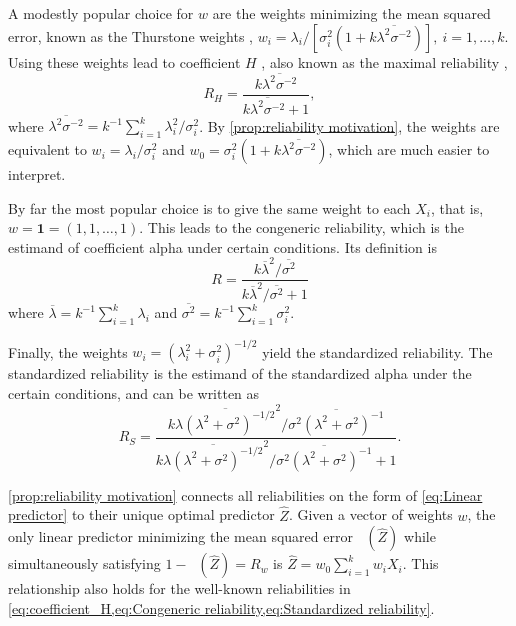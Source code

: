\documentclass[twoside]{article}
\DeclareMathOperator{\MSE}{MSE_Z}
\begin{document}
A modestly popular choice for $w$ are the weights minimizing the mean squared error, known as the Thurstone weights \citep{thurshronebook}, $w_{i}=\lambda_{i}/[\sigma_{i}^{2}(1+k\overline{\lambda^{2}\sigma^{-2}})],\:i=1,\ldots,k$. Using these weights lead to coefficient $H$ \citep{hancock2001rethinking}, also known as the maximal reliability \citep{Li1997-yh}, 
\begin{equation}
\label{eq:coefficient_H}
 R_{H}=\frac{k\overline{\lambda^{2}\sigma^{-2}}}{k\overline{\lambda^{2}\sigma^{-2}}+1},
\end{equation}
where $\overline{\lambda^{2}\sigma^{-2}} = k^{-1}\sum_{i=1}^{k}\lambda_{i}^2/\sigma_i^2$. By \cref{prop:reliability motivation}, the weights are equivalent to $w_i = \lambda_i/\sigma_i^2$ and $w_0 = \sigma_{i}^{2}(1+k\overline{\lambda^{2}\sigma^{-2}})$, which are much easier to interpret.

By far the most popular choice is to give the same weight to each $X_i$, that is, $w = \boldsymbol{1}=(1,1,\ldots,1)$. This leads to the congeneric reliability, which is the estimand of coefficient alpha under certain conditions. Its definition is
\begin{equation}
 R =\frac{k\overline{\lambda}^{2}/\overline{\sigma^{2}}}{k\overline{\lambda}^{2}/\overline{\sigma^{2}} + 1}\label{eq:Congeneric reliability}
\end{equation}
where $\overline{\lambda}=k^{-1}\sum_{i=1}^{k}\lambda_{i}$ and
$\overline{\sigma^{2}}=k^{-1}\sum_{i=1}^{k}\sigma_{i}^{2}$. 

Finally, the weights $w_i = (\lambda_i^2 + \sigma_i^2)^{-1/2}$ yield the standardized reliability. The standardized reliability is the estimand of the standardized alpha under the certain conditions, and can be written as
\begin{equation}
 R_S=\frac{k\overline{\lambda(\lambda^{2}+\sigma^{2})^{-1/2}}^{2}/\overline{\sigma^{2}(\lambda^{2}+\sigma^{2})^{-1}}}{k\overline{\lambda(\lambda^{2}+\sigma^{2})^{-1/2}}^{2}/\overline{\sigma^{2}(\lambda^{2}+\sigma^{2})^{-1}}+1}.\label{eq:Standardized reliability}
\end{equation}

\cref{prop:reliability motivation} connects all reliabilities on the form of \cref{eq:Linear predictor} to their unique optimal predictor $\hat{Z}$. Given a vector of weights $w$, the only linear predictor minimizing the mean squared error $\MSE(\hat{Z})$ while simultaneously satisfying $1-\MSE(\hat{Z})=R_w$ is $\hat{Z}=w_0\sum_{i=1}^k w_iX_i$. This relationship also holds for the well-known reliabilities in \cref{eq:coefficient_H,eq:Congeneric reliability,eq:Standardized reliability}.
\end{document}
